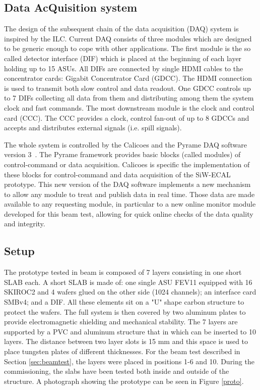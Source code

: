 \documentclass[a4paper,11pt]{article}
\begin{document}
\subsection{Data AcQuisition system}
\label{sec:DAQ}

The design of the subsequent chain of the data acquisition (DAQ)\cite{Gastaldi:2014vaa} system is inspired by the ILC.
Current DAQ consists of three modules which are designed to be generic enough to cope with other applications.
The first module is the so called detector interface (DIF) which is placed at the beginning of each layer holding up to 15 ASUs.
All DIFs are connected by single HDMI cables to the concentrator cards: Gigabit Concentrator Card (GDCC).
The HDMI connection is used to transmit both slow control and data readout.
One GDCC controls up to 7 DIFs collecting all data from them and distributing among them the system clock and fast commands.
The most downstream module is the clock and control card (CCC).
The CCC provides a clock, control fan-out of up to 8 GDCCs and accepts and distributes external signals (i.e. spill signals).

The whole system is controlled by the Calicoes and the Pyrame DAQ software version 3~\cite{Rubio-Roy:2017ere,Magniette:2018wdz}.
The Pyrame framework provides basic blocks (called modules) of control-command or data acquisition.
Calicoes is specific the implementation of these blocks for control-command and data acquisition of the SiW-ECAL prototype. 
This new version of the DAQ software implements a new mechanism to allow any module to treat and publish data in real time. 
Those data are made available to any requesting module, in particular to a new online monitor module developed
for this beam test, allowing for quick online checks of the data quality and integrity.

\subsection{Setup}
\label{sec:setup}

The prototype tested in beam is composed of 7 layers consisting in one short SLAB each.
A short SLAB is made of: one single ASU FEV11 equipped with 16 SKIROC2 and 4 wafers glued on the other side (1024 channels);
an interface card SMBv4; and a DIF. All these elements sit on a "U" shape carbon structure to protect the wafers.
The full system is then covered by two aluminum plates to provide electromagnetic shielding and mechanical stability.
The 7 layers are supported by a PVC and aluminum structure that in which can be inserted to 10 layers.
The distance between two layer slots is 15 mm and this space is used to place tungsten plates of different thicknesses.
For the beam test described in Section \ref{sec:beamtest}, the layers were placed in positions 1-6 and 10.
During the commissioning, the slabs have been tested both inside and outside of the structure.
A photograph showing the prototype can be seen in Figure \ref{proto}. 
\end{document}
